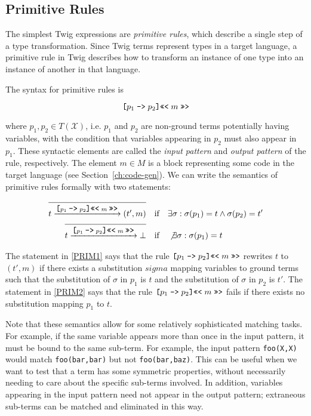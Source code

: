
\subsection{Primitive Rules}
\label{sec:semantics:prims}

The simplest Twig expressions are \emph{primitive rules}, which
describe a single step of a type transformation. Since Twig terms
represent types in a target language, a primitive rule in Twig
describes how to transform an instance of one type into an
instance of another in that language.

The syntax for primitive rules is

\[
\mbox{\texttt{[}} p_1 \;\mbox{\texttt{->}}\; p_2 \mbox{\texttt{]}} \mbox{\texttt{<<<}}\; m \;\mbox{\texttt{>>>}}
\]

where $p_1,p_2 \in T(\mathcal{X})$, i.e. $p_1$ and $p_2$ are
non-ground terms potentially having variables, with the condition
that variables appearing in $p_2$ must also appear in $p_1$. These
syntactic elements are called the \emph{input pattern} and
\emph{output pattern} of the rule, respectively. The element $m
\in M$ is a block representing some code in the target language
(see Section~\ref{ch:code-gen}). We can write the semantics of
primitive rules formally with two statements:

\begin{align}
\label{PRIM1}
\infer{t \arr{\prim{p_1}{p_2}{m}} (t',m)}{} &
\quad\mbox{if}\quad \exists \sigma : 
\sigma(p_1) = t \wedge \sigma(p_2) = t'\\
\label{PRIM2}
\infer{t \arr{\prim{p_1}{p_2}{m}} \bot}{} &
\quad\mbox{if}\quad \not{\exists} \sigma : 
\sigma(p_1) = t
\end{align}

The statement in \eqref{PRIM1} says that the rule
$\mbox{\texttt{[}} p_1 \;\mbox{\texttt{->}}\; p_2 \mbox{\texttt{]}} \mbox{\texttt{<<<}}\; m \;\mbox{\texttt{>>>}}$ rewrites $t$ to $(t',m)$ if there exists a
substitution $sigma$ mapping variables to ground terms such that
the substitution of $\sigma$ in $p_1$ is $t$ and the substitution
of $\sigma$ in $p_2$ is $t'$. The statement in \eqref{PRIM2} says
that the rule $\mbox{\texttt{[}} p_1 \;\mbox{\texttt{->}}\; p_2 \mbox{\texttt{]}} \mbox{\texttt{<<<}}\; m \;\mbox{\texttt{>>>}}$ fails if there exists no
substitution mapping $p_1$ to $t$.

Note that these semantics allow for some relatively sophisticated
matching tasks. For example, if the same variable appears more
than once in the input pattern, it must be bound to the same
sub-term. For example, the input pattern \texttt{foo(X,X)} would
match \texttt{foo(bar,bar)} but not \texttt{foo(bar,baz)}. This
can be useful when we want to test that a term has some symmetric
properties, without necessarily needing to care about the specific
sub-terms involved. In addition, variables appearing in the input
pattern need not appear in the output pattern; extraneous
sub-terms can be matched and eliminated in this way.

